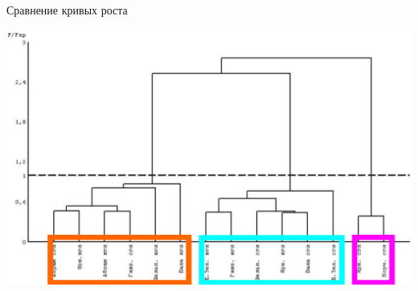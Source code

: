 \documentclass{beamer}
\begin{document}
\begin{frame}{Сравнение кривых роста}
\begin{minipage}[t]{.3\linewidth}
			\includegraphics[height=\textwidth, angle=90]{dendrogramma_sravnenie_rosta_linear_all_gorizonts.pdf}
	\end{minipage}
\end{frame}
\end{document}
